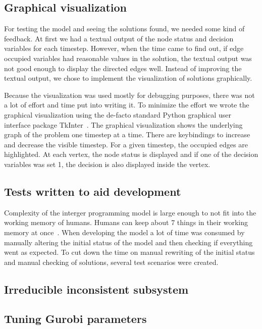 \subsection{Graphical visualization}
For testing the model and seeing the solutions found, we needed some kind of
feedback. At first we had a textual output of the node status and decision
variables for each timestep.
However, when the time came to find out, if edge occupied variables had
reasonable values in the solution, the textual output was not good enough to
display the directed edges well. Instead of improving the textual output, we
chose to implement the visualization of solutions graphically.

Because the visualization was used mostly for debugging purposes, there was not
a lot of effort and time put into writing it. To minimize the effort we wrote
the graphical visualization using the de-facto standard Python graphical user
interface package TkInter~\cite{tkinter}. The graphical visualization shows the
underlying graph of the problem one timestep at a time. There are keybindings
to increase and decrease the visible timestep. For a given timestep, the
occupied edges are highlighted. At each vertex, the node status is displayed
and if one of the decision variables was set 1, the decision is also displayed
inside the vertex.
\subsection{Tests written to aid development}
Complexity of the interger programming model is large enough to not fit into
the working memory of humans. Humans can keep about 7 things in their working
memory at once~\cite{magic7}. When developing the model a lot of time was
consumed by manually altering the initial status of the model and then checking
if everything went as expected. To cut down the time on manual rewriting of the
initial status and manual checking of solutions, several test scenarios were
created.
\subsection{Irreducible inconsistent subsystem}
\subsection{Tuning Gurobi parameters}
